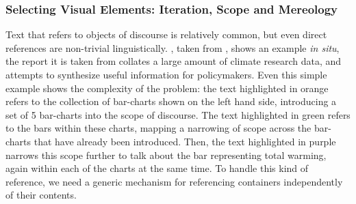 \subsubsection{Selecting Visual Elements: Iteration, Scope and Mereology}
Text that refers to objects of discourse is relatively common, but even direct references are non-trivial
linguistically. , taken from \citet{lee23}, shows an example \textit{in situ}, the report
it is taken from collates a large amount of climate research data, and attempts to synthesize useful
information for policymakers. Even this simple example shows the complexity of the problem: the text
highlighted in orange refers to the collection of bar-charts shown on the left hand side, introducing a set of
5 bar-charts into the scope of discourse. The text highlighted in green refers to the bars within these
charts, mapping a narrowing of scope across the bar-charts that have already been introduced. Then, the text
highlighted in purple narrows this scope further to talk about the bar representing total warming, again
within each of the charts at the same time. To handle this kind of reference, we need a generic mechanism for
referencing containers independently of their contents.



